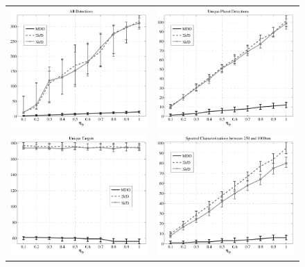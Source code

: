  \begin{figure}[ht]
 \begin{center}
  \begin{tabular}{c c}
   \includegraphics[width=2.9in]{./figures/c16m_ADETs} &
   \includegraphics[width=2.9in]{./figures/c16m_AuDETs} \\
   \includegraphics[width=2.9in]{./figures/c16m_Auvisits} &
   \includegraphics[width=2.9in]{./figures/c16m_ASPECTRA}

\end{tabular}
\end{center}
\end{figure}

